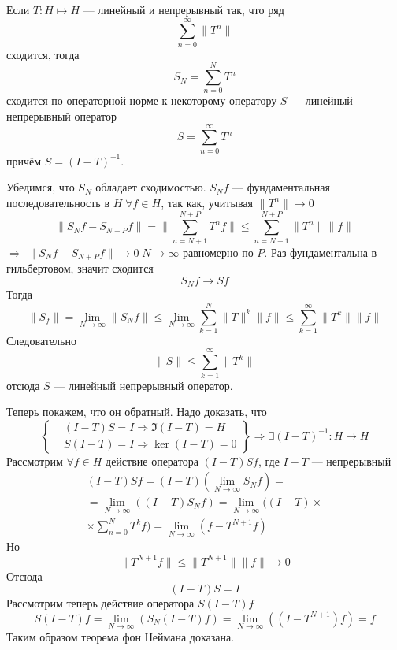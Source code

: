 \documentclass[14pt]{extarticle}
\begin{document}
\begin{Theor}
    Если $T : H \mapsto H$ --- линейный и непрерывный так, что ряд 
    $$
    \sum_{n = 0}^\infty \|T^n\|
    $$
    сходится, тогда
    $$
    S_N = \sum_{n = 0}^N T^n
    $$
    сходится по операторной норме
    к некоторому оператору $S$ --- линейный непрерывный оператор
    $$
    S = \sum_{n = 0}^\infty T^n
    $$
    причём $S = (I - T)^{-1}$.
\end{Theor}
\begin{Proof}
    Убедимся, что $S_N$ обладает сходимостью.
    $S_N f$ --- фундаментальная последовательность в $H\; \forall f \in H$, так как,
    учитывая $\|T^n\| \to 0$ 
    $$
    \|S_N f - S_{N+P} f\| = \|\sum_{n = N + 1}^{N + P} T^n f\|
    \le \sum_{n = N + 1}^{N + P}\|T^n\|\|f\| 
    $$
    $\Rightarrow$ $\|S_N f - S_{N+P} f\| \to 0\; N \to \infty$ равномерно по $P$.
    Раз фундаментальна в гильбертовом, значит сходится 
    $$
    S_N f \to Sf
    $$
    Тогда 
    $$
    \|S_f\| = \lim \limits_{N \to \infty}\|S_N f\| \le \lim \limits_{N \to \infty} \sum_{k = 1}^N \|T\|^k\|f\| \le \sum_{k = 1}^{\infty} \|T^k\| \|f\|
    $$
    Следовательно 
    $$
    \|S\| \le \sum \limits_{k = 1}^{\infty}\|T^k\|
    $$ 
    отсюда $S$ --- линейный непрерывный оператор.

    Теперь покажем, что он обратный.
    Надо доказать, что 
    $$
    \left\{
        \begin{aligned}
            &(I - T)S = I \Rightarrow \Im(I - T) = H\\
            &S(I - T) = I \Rightarrow \ker(I - T) = 0
        \end{aligned}
    \right\} \Rightarrow \exists (I - T)^{-1} : H \mapsto H
    $$
    Рассмотрим $\forall f \in H$ действие оператора $(I - T)Sf$, где $I - T$ --- непрерывный
    \begin{multline*}
    (I - T)Sf = (I - T)(\lim \limits_{N \to \infty} S_N f) = \\
    = \lim \limits_{N \to \infty}((I - T)S_N f) 
    = \lim \limits_{N \to \infty}((I - T) \times \\
    \times \sum\limits_{n = 0}^N T^k f) = \lim \limits_{N \to \infty}(f - T^{N+1}f)
    \end{multline*}
    Но
    $$
    \|T^{N+1}f\| \le \|T^{N+1}\|\|f\| \to 0
    $$
    Отсюда 
    $$
    (I - T)S = I
    $$
    Рассмотрим теперь действие оператора $S(I - T)f$
    $$
    S(I - T)f = \lim \limits_{N \to \infty}(S_N(I - T)f) = \lim \limits_{N \to \infty}((I - T^{N+1})f) = f
    $$
    Таким образом теорема фон Неймана доказана.
\end{Proof}
\end{document}
